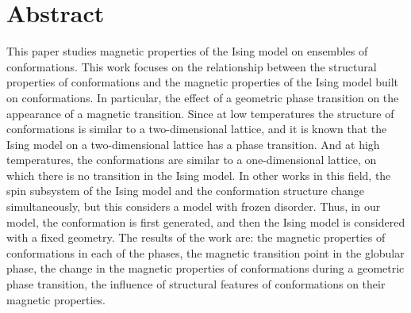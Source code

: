 \section*{Abstract}

This paper studies magnetic properties of the Ising model on ensembles of conformations.
This work focuses on the relationship between the structural properties of conformations and the magnetic properties of the Ising model built on conformations. In particular, the effect of a geometric phase transition on the appearance of a magnetic transition. Since at low temperatures the structure of conformations is similar to a two-dimensional lattice, and it is known that the Ising model on a two-dimensional lattice has a phase transition. And at high temperatures, the conformations are similar to a one-dimensional lattice, on which there is no transition in the Ising model.
In other works in this field, the spin subsystem of the Ising model and the conformation structure change simultaneously, but this considers a model with frozen disorder. Thus, in our model, the conformation is first generated, and then the Ising model is considered with a fixed geometry.
The results of the work are: the magnetic properties of conformations in each of the phases, the magnetic transition point in the globular phase, the change in the magnetic properties of conformations during a geometric phase transition, the influence of structural features of conformations on their magnetic properties.